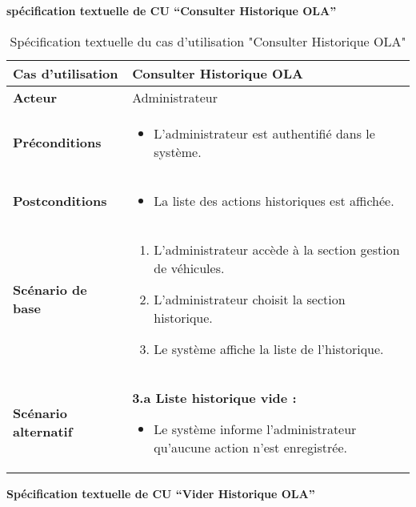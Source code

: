 \documentclass[a4paper,11pt]{report}
\begin{document}
\newpage
\textbf{spécification textuelle de CU “Consulter Historique OLA”
}

\begin{table}[H]
  \centering
  \renewcommand{\arraystretch}{1.5}
  \caption{Spécification textuelle du cas d'utilisation "Consulter Historique OLA"}
  \begin{tabularx}{\textwidth}{|l|X|}
    \hline
    \textbf{Cas d'utilisation} & Consulter Historique OLA \\ \hline
    \textbf{Acteur}            & Administrateur \\ \hline
    \textbf{Préconditions}     & 
      \begin{itemize}
        \item L’administrateur est authentifié dans le système.
      \end{itemize} \\ \hline
    \textbf{Postconditions}    & 
      \begin{itemize}
        \item La liste des actions historiques est affichée.
      \end{itemize} \\ \hline
    \textbf{Scénario de base}  & 
      \begin{enumerate}
        \item L’administrateur accède à la section gestion de véhicules.
        \item L'administrateur choisit la section historique.
        \item Le système affiche la liste de l'historique.
      \end{enumerate} \\ \hline
    \textbf{Scénario alternatif} & 
      \textbf{3.a Liste historique vide :}
      \begin{itemize}
        \item Le système informe l’administrateur qu’aucune action n’est enregistrée.
      \end{itemize} \\ \hline
  \end{tabularx}
\end{table}

\newpage
\textbf{Spécification textuelle de CU “Vider Historique OLA”}
\end{document}
